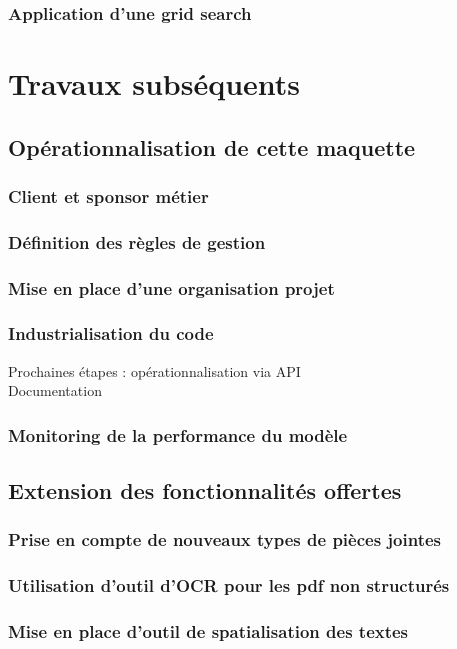 \documentclass{report}
\begin{document}
        \section{Application d'une grid search}

\part{Travaux subséquents}
    \chapter{Opérationnalisation de cette maquette}    
        \section{Client et sponsor métier}
        \section{Définition des règles de gestion}
        \section{Mise en place d'une organisation projet}
        \section{Industrialisation du code}
        Prochaines étapes : opérationnalisation via API \\
        Documentation
        \section{Monitoring de la performance du modèle}
    \chapter{Extension des fonctionnalités offertes}
        \section{Prise en compte de nouveaux types de pièces jointes}
        \section{Utilisation d'outil d'OCR pour les pdf non structurés}
        \section{Mise en place d'outil de spatialisation des textes}
\end{document}
